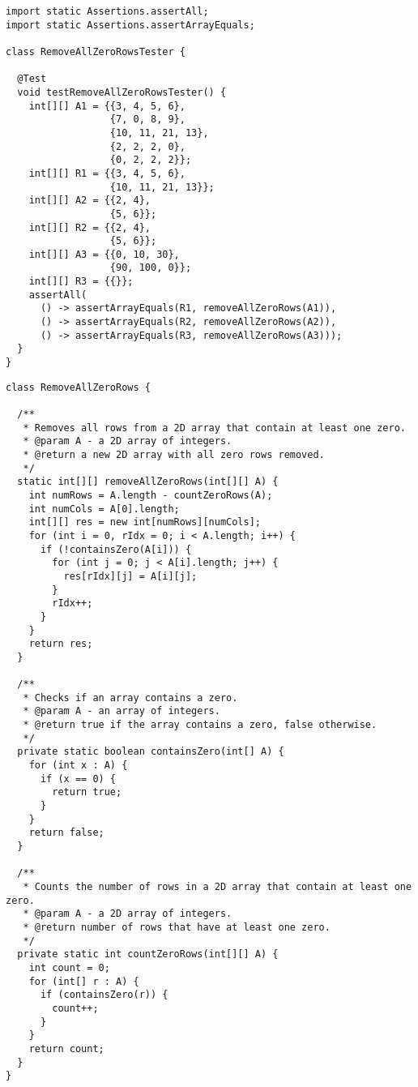 \begin{lstlisting}[language=MyJava]
import static Assertions.assertAll;
import static Assertions.assertArrayEquals;

class RemoveAllZeroRowsTester {

  @Test
  void testRemoveAllZeroRowsTester() {
    int[][] A1 = {{3, 4, 5, 6}, 
                  {7, 0, 8, 9}, 
                  {10, 11, 21, 13}, 
                  {2, 2, 2, 0}, 
                  {0, 2, 2, 2}};
    int[][] R1 = {{3, 4, 5, 6}, 
                  {10, 11, 21, 13}};
    int[][] A2 = {{2, 4}, 
                  {5, 6}};
    int[][] R2 = {{2, 4}, 
                  {5, 6}};
    int[][] A3 = {{0, 10, 30},
                  {90, 100, 0}};
    int[][] R3 = {{}};
    assertAll(
      () -> assertArrayEquals(R1, removeAllZeroRows(A1)),
      () -> assertArrayEquals(R2, removeAllZeroRows(A2)),
      () -> assertArrayEquals(R3, removeAllZeroRows(A3)));
  }
}
\end{lstlisting}

\enlargethispage{-4\baselineskip}
\begin{lstlisting}[language=MyJava]
class RemoveAllZeroRows {

  /**
   * Removes all rows from a 2D array that contain at least one zero.
   * @param A - a 2D array of integers.
   * @return a new 2D array with all zero rows removed.
   */
  static int[][] removeAllZeroRows(int[][] A) {
    int numRows = A.length - countZeroRows(A);
    int numCols = A[0].length;
    int[][] res = new int[numRows][numCols];
    for (int i = 0, rIdx = 0; i < A.length; i++) {
      if (!containsZero(A[i])) {
        for (int j = 0; j < A[i].length; j++) {
          res[rIdx][j] = A[i][j];
        }
        rIdx++;
      }
    }
    return res;
  }

  /**
   * Checks if an array contains a zero.
   * @param A - an array of integers.
   * @return true if the array contains a zero, false otherwise.
   */
  private static boolean containsZero(int[] A) {
    for (int x : A) {
      if (x == 0) { 
        return true; 
      }
    }
    return false;
  }

  /**
   * Counts the number of rows in a 2D array that contain at least one zero.
   * @param A - a 2D array of integers.
   * @return number of rows that have at least one zero.
   */
  private static int countZeroRows(int[][] A) {
    int count = 0;
    for (int[] r : A) {
      if (containsZero(r)) {
        count++;
      }
    }
    return count;
  }
}
\end{lstlisting}

